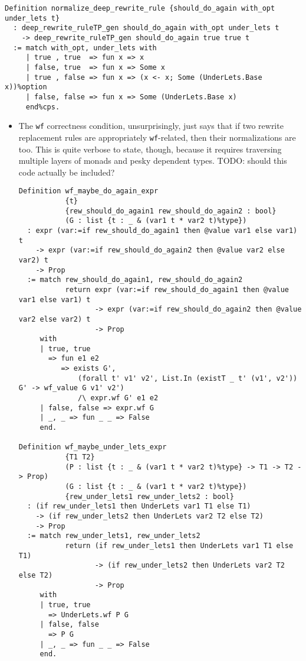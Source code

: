 \documentclass[
]{article}
\begin{document}
\begin{itemize}
\begin{itemize}
\begin{verbatim}
Definition normalize_deep_rewrite_rule {should_do_again with_opt under_lets t}
  : deep_rewrite_ruleTP_gen should_do_again with_opt under_lets t
    -> deep_rewrite_ruleTP_gen should_do_again true true t
  := match with_opt, under_lets with
     | true , true  => fun x => x
     | false, true  => fun x => Some x
     | true , false => fun x => (x <- x; Some (UnderLets.Base x))%option
     | false, false => fun x => Some (UnderLets.Base x)
     end%cps.
\end{verbatim}

    \begin{itemize}
    \item
      The \texttt{wf} correctness condition, unsurprisingly, just says
      that if two rewrite replacement rules are appropriately
      \texttt{wf}-related, then their normalizations are too. This is
      quite verbose to state, though, because it requires traversing
      multiple layers of monads and pesky dependent types. TODO: should
      this code actually be included?

\begin{verbatim}
Definition wf_maybe_do_again_expr
           {t}
           {rew_should_do_again1 rew_should_do_again2 : bool}
           (G : list {t : _ & (var1 t * var2 t)%type})
  : expr (var:=if rew_should_do_again1 then @value var1 else var1) t
    -> expr (var:=if rew_should_do_again2 then @value var2 else var2) t
    -> Prop
  := match rew_should_do_again1, rew_should_do_again2
           return expr (var:=if rew_should_do_again1 then @value var1 else var1) t
                  -> expr (var:=if rew_should_do_again2 then @value var2 else var2) t
                  -> Prop
     with
     | true, true
       => fun e1 e2
          => exists G',
              (forall t' v1' v2', List.In (existT _ t' (v1', v2')) G' -> wf_value G v1' v2')
              /\ expr.wf G' e1 e2
     | false, false => expr.wf G
     | _, _ => fun _ _ => False
     end.

Definition wf_maybe_under_lets_expr
           {T1 T2}
           (P : list {t : _ & (var1 t * var2 t)%type} -> T1 -> T2 -> Prop)
           (G : list {t : _ & (var1 t * var2 t)%type})
           {rew_under_lets1 rew_under_lets2 : bool}
  : (if rew_under_lets1 then UnderLets var1 T1 else T1)
    -> (if rew_under_lets2 then UnderLets var2 T2 else T2)
    -> Prop
  := match rew_under_lets1, rew_under_lets2
           return (if rew_under_lets1 then UnderLets var1 T1 else T1)
                  -> (if rew_under_lets2 then UnderLets var2 T2 else T2)
                  -> Prop
     with
     | true, true
       => UnderLets.wf P G
     | false, false
       => P G
     | _, _ => fun _ _ => False
     end.


\end{verbatim}
\end{itemize}
\end{itemize}
\end{itemize}
\end{document}
